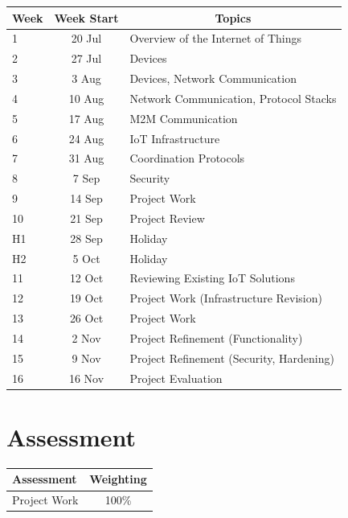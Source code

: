 \documentclass{article}
\begin{document}
\renewcommand{\arraystretch}{1.5}
\begin{tabular}{|l|c|l|}
\hline
 Week & Week Start & \multicolumn{1}{c|}{Topics}             \\ \hline
 1    & 20 Jul     & Overview of the Internet of Things      \\ \hline
 2    & 27 Jul     & Devices                                 \\ \hline
 3    &  3 Aug     & Devices, Network Communication          \\ \hline
 4    & 10 Aug     & Network Communication, Protocol Stacks  \\ \hline
 5    & 17 Aug     & M2M Communication                       \\ \hline
 6    & 24 Aug     & IoT Infrastructure                      \\ \hline
 7    & 31 Aug     & Coordination Protocols                  \\ \hline
 8    &  7 Sep     & Security                                \\ \hline
 9    & 14 Sep     & Project Work                            \\ \hline
 10   & 21 Sep     & Project Review                          \\ \hline
 H1   & 28 Sep     & Holiday                                 \\ \hline
 H2   &  5 Oct     & Holiday                                 \\ \hline
 11   & 12 Oct     & Reviewing Existing IoT Solutions        \\ \hline
 12   & 19 Oct     & Project Work (Infrastructure Revision)  \\ \hline
 13   & 26 Oct     & Project Work                            \\ \hline
 14   &  2 Nov     & Project Refinement (Functionality)      \\ \hline
 15   &  9 Nov     & Project Refinement (Security, Hardening)\\ \hline
 16   & 16 Nov     & Project Evaluation                      \\ \hline
\end{tabular}

\section*{Assessment}

\begin{tabular}{|l|c|}
\hline
Assessment                  &  Weighting \\ \hline
Project Work                &  100\% \\ \hline
\end{tabular}
\end{document}
